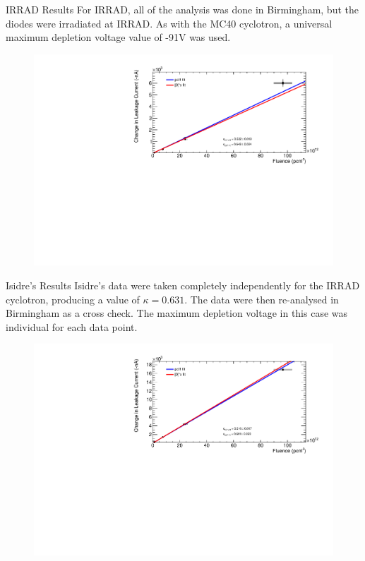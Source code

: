 \documentclass{beamer}
\begin{document}
    \begin{frame}{IRRAD Results}
    For IRRAD, all of the analysis was done in Birmingham, but the diodes were irradiated at IRRAD. As with the MC40 cyclotron, a universal maximum depletion voltage value of -91V was used.
        \begin{figure}
            \centering
            \includegraphics[width = 0.95\linewidth]{IRRAD.pdf}
        \end{figure}
    \end{frame}
    
    \begin{frame}{Isidre's Results}
    Isidre's data were taken completely independently for the IRRAD cyclotron, producing a value of $\kappa = 0.631 $. The data were then re-analysed in Birmingham as a cross check. The maximum depletion voltage in this case was individual for each data point.
        \begin{figure}
            \centering
            \includegraphics[width = 0.95\linewidth]{Isidre.pdf}
        \end{figure}
    \end{frame}
    
\end{document}
